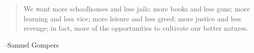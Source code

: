 \documentclass{exam}
\begin{document}
  \else
    \vspace{9 cm}
    \begin{quote}
      \begin{em}
        We want more schoolhouses and less jails; more books and less guns; more learning and less vice; more
        leisure and less greed; more justice and less revenge; in fact, more of the opportunities to cultivate our
        better natures.
      \end{em}
    \end{quote}
    \hspace{1 cm} --Samuel Gompers
  \fi
\end{document}
